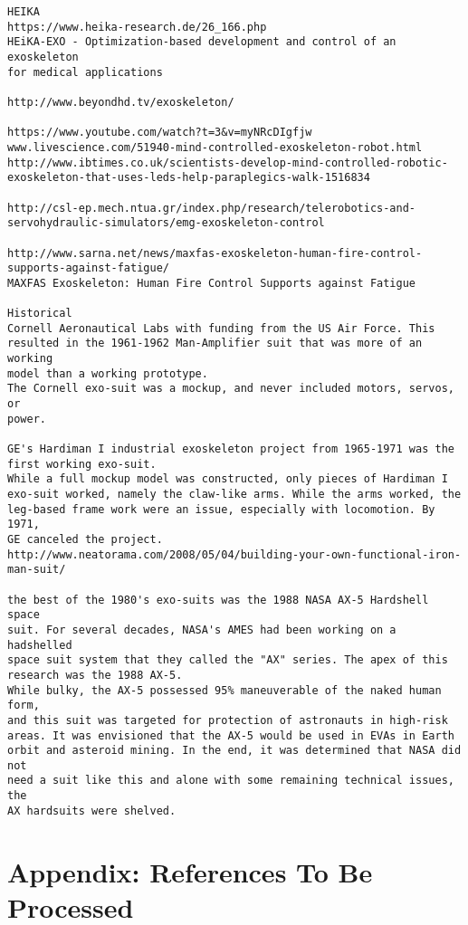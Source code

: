 \documentclass[letterpaper,12pt,fullpage]{article}
\begin{document}
\begin{verbatim}
HEIKA
https://www.heika-research.de/26_166.php
HEiKA-EXO - Optimization-based development and control of an exoskeleton
for medical applications

http://www.beyondhd.tv/exoskeleton/

https://www.youtube.com/watch?t=3&v=myNRcDIgfjw
www.livescience.com/51940-mind-controlled-exoskeleton-robot.html
http://www.ibtimes.co.uk/scientists-develop-mind-controlled-robotic-exoskeleton-that-uses-leds-help-paraplegics-walk-1516834

http://csl-ep.mech.ntua.gr/index.php/research/telerobotics-and-servohydraulic-simulators/emg-exoskeleton-control

http://www.sarna.net/news/maxfas-exoskeleton-human-fire-control-supports-against-fatigue/
MAXFAS Exoskeleton: Human Fire Control Supports against Fatigue

Historical
Cornell Aeronautical Labs with funding from the US Air Force. This
resulted in the 1961-1962 Man-Amplifier suit that was more of an working
model than a working prototype.
The Cornell exo-suit was a mockup, and never included motors, servos, or
power.

GE's Hardiman I industrial exoskeleton project from 1965-1971 was the
first working exo-suit.
While a full mockup model was constructed, only pieces of Hardiman I
exo-suit worked, namely the claw-like arms. While the arms worked, the
leg-based frame work were an issue, especially with locomotion. By 1971,
GE canceled the project.
http://www.neatorama.com/2008/05/04/building-your-own-functional-iron-man-suit/

the best of the 1980's exo-suits was the 1988 NASA AX-5 Hardshell space
suit. For several decades, NASA's AMES had been working on a hadshelled
space suit system that they called the "AX" series. The apex of this
research was the 1988 AX-5.
While bulky, the AX-5 possessed 95% maneuverable of the naked human form,
and this suit was targeted for protection of astronauts in high-risk
areas. It was envisioned that the AX-5 would be used in EVAs in Earth
orbit and asteroid mining. In the end, it was determined that NASA did not
need a suit like this and alone with some remaining technical issues, the
AX hardsuits were shelved.
\end{verbatim}

\newpage

\section{Appendix: References To Be Processed}
\end{document}
